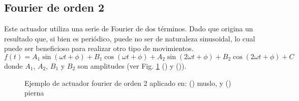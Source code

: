 \documentclass{article}
\begin{document}
\subsection{Fourier de orden 2}
Este actuador utiliza una serie de Fourier de dos t\'erminos. Dado que origina un resultado que, si bien es peri\'odico, puede no ser de naturaleza sinusoidal, lo cual puede ser beneficioso para realizar otro tipo de movimientos.
\begin{equation}
  f(t) =  A_1 \sin(\omega t+\phi)+B_1 \cos(\omega t+\phi)+A_2 \sin(2\omega t+\phi)+B_2 \cos(2\omega t+\phi)+C
\end{equation}
donde $A_{1}$, $A_{2}$, $B_{1}$ y $B_{2}$ son amplitudes (ver Fig. \ref{actuadores:fourier2} () y ()).
\begin{figure}[H]%
  \centering
  \captionsetup{justification=centering}
  \caption{Ejemplo de actuador fourier de orden 2 aplicado en: (\protect{}) muslo, y (\protect{}) pierna}%
  \label{actuadores:fourier2} %
\end{figure}
\end{document}
